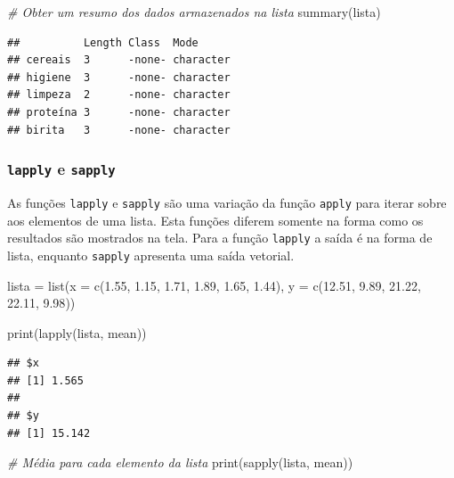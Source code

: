\documentclass[
]{article}
\newenvironment{Shaded}{\begin{snugshade}}{\end{snugshade}}
\newcommand{\AttributeTok}[1]{\textcolor[rgb]{0.77,0.63,0.00}{#1}}
\newcommand{\CommentTok}[1]{\textcolor[rgb]{0.56,0.35,0.01}{\textit{#1}}}
\newcommand{\FloatTok}[1]{\textcolor[rgb]{0.00,0.00,0.81}{#1}}
\newcommand{\FunctionTok}[1]{\textcolor[rgb]{0.00,0.00,0.00}{#1}}
\newcommand{\NormalTok}[1]{#1}
\newcommand{\OtherTok}[1]{\textcolor[rgb]{0.56,0.35,0.01}{#1}}
\begin{document}
\begin{Shaded}
\begin{Highlighting}[]
\CommentTok{\# Obter um resumo dos dados armazenados na lista}
\FunctionTok{summary}\NormalTok{(lista)}
\end{Highlighting}
\end{Shaded}

\begin{verbatim}
##          Length Class  Mode     
## cereais  3      -none- character
## higiene  3      -none- character
## limpeza  2      -none- character
## proteína 3      -none- character
## birita   3      -none- character
\end{verbatim}

\hypertarget{lapply-e-sapply}{%
\subsubsection{\texorpdfstring{\texttt{lapply} e
\texttt{sapply}}{lapply e sapply}}\label{lapply-e-sapply}}

As funções \texttt{lapply} e \texttt{sapply} são uma variação da função
\texttt{apply} para iterar sobre aos elementos de uma lista. Esta
funções diferem somente na forma como os resultados são mostrados na
tela. Para a função \texttt{lapply} a saída é na forma de lista,
enquanto \texttt{sapply} apresenta uma saída vetorial.

\begin{Shaded}
\begin{Highlighting}[]
\NormalTok{lista }\OtherTok{=} \FunctionTok{list}\NormalTok{(}\AttributeTok{x =} \FunctionTok{c}\NormalTok{(}\FloatTok{1.55}\NormalTok{, }\FloatTok{1.15}\NormalTok{, }\FloatTok{1.71}\NormalTok{, }\FloatTok{1.89}\NormalTok{, }\FloatTok{1.65}\NormalTok{, }\FloatTok{1.44}\NormalTok{), }
             \AttributeTok{y =} \FunctionTok{c}\NormalTok{(}\FloatTok{12.51}\NormalTok{, }\FloatTok{9.89}\NormalTok{, }\FloatTok{21.22}\NormalTok{, }\FloatTok{22.11}\NormalTok{, }\FloatTok{9.98}\NormalTok{))}

\FunctionTok{print}\NormalTok{(}\FunctionTok{lapply}\NormalTok{(lista, mean))}
\end{Highlighting}
\end{Shaded}

\begin{verbatim}
## $x
## [1] 1.565
## 
## $y
## [1] 15.142
\end{verbatim}

\begin{Shaded}
\begin{Highlighting}[]
\CommentTok{\# Média para cada elemento da lista}
\FunctionTok{print}\NormalTok{(}\FunctionTok{sapply}\NormalTok{(lista, mean))}
\end{Highlighting}
\end{Shaded}
\end{document}
